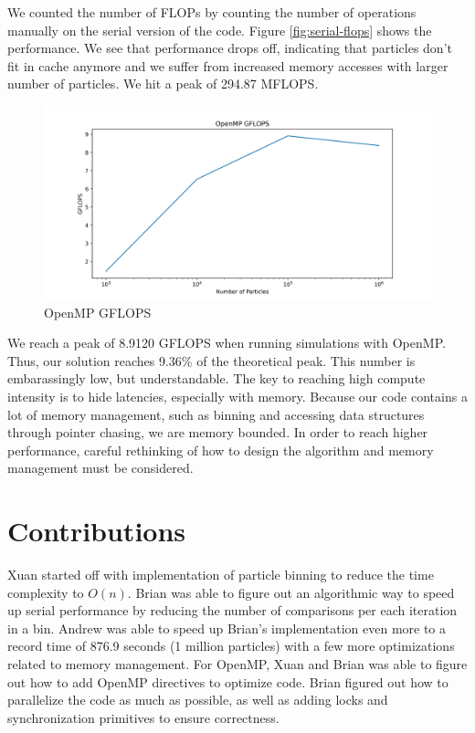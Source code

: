 \documentclass{article}
\begin{document}
We counted the number of FLOPs by counting the number of operations manually on the serial version of the code. Figure \ref{fig:serial-flops} shows the performance. We see that performance drops off, indicating that particles don't fit in cache anymore and we suffer from increased memory accesses with larger number of particles. We hit a peak of 294.87 MFLOPS.

\begin{figure}[H]
\centering
\includegraphics[width=6in]{figures/openmp_flops.png}
\caption{OpenMP GFLOPS}
\label{fig:openmp-flops}
\end{figure}

We reach a peak of 8.9120 GFLOPS when running simulations with OpenMP. Thus, our solution reaches 9.36\% of the theoretical peak. This number is embarassingly low, but understandable. The key to reaching high compute intensity is to hide latencies, especially with memory. Because our code contains a lot of memory management, such as binning and accessing data structures through pointer chasing, we are memory bounded. In order to reach higher performance, careful rethinking of how to design the algorithm and memory management must be considered.

\section{Contributions}
Xuan started off with implementation of particle binning to reduce the time complexity to $O(n)$. Brian was able to figure out an algorithmic way to speed up serial performance by reducing the number of comparisons per each iteration in a bin. Andrew was able to speed up Brian's implementation even more to a record time of 876.9 seconds (1 million particles) with a few more optimizations related to memory management. For OpenMP, Xuan and Brian was able to figure out how to add OpenMP directives to optimize code. Brian figured out how to parallelize the code as much as possible, as well as adding locks and synchronization primitives to ensure correctness.


 
\end{document}
